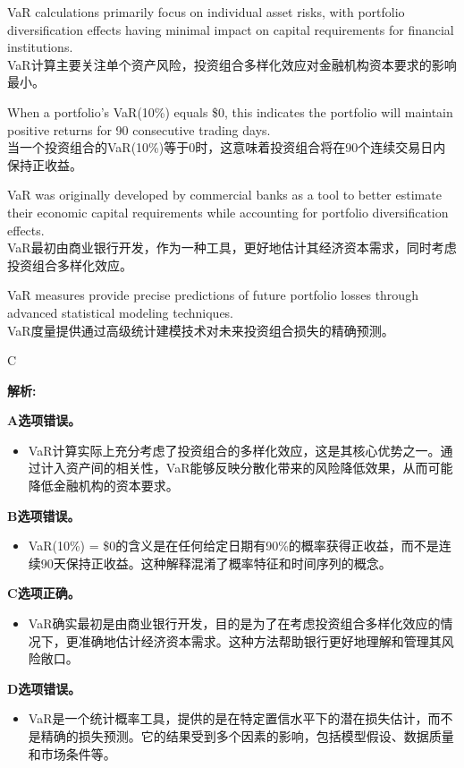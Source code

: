 \documentclass{article}
\newenvironment{explanation}
{\textbf{解析:}\par}
{\par}
\begin{document}
\begin{choices}
    \item VaR calculations primarily focus on individual asset risks, with portfolio diversification effects having minimal impact on capital requirements for financial institutions.\\
    VaR计算主要关注单个资产风险，投资组合多样化效应对金融机构资本要求的影响最小。
    
    \item When a portfolio's VaR(10\%) equals \$0, this indicates the portfolio will maintain positive returns for 90 consecutive trading days.\\
    当一个投资组合的VaR(10\%)等于0时，这意味着投资组合将在90个连续交易日内保持正收益。
    
    \item VaR was originally developed by commercial banks as a tool to better estimate their economic capital requirements while accounting for portfolio diversification effects.\\
    VaR最初由商业银行开发，作为一种工具，更好地估计其经济资本需求，同时考虑投资组合多样化效应。
    
    \item VaR measures provide precise predictions of future portfolio losses through advanced statistical modeling techniques.\\
    VaR度量提供通过高级统计建模技术对未来投资组合损失的精确预测。
\end{choices}

\begin{correctanswer}
    C
\end{correctanswer}

\begin{explanation}
    \textbf{A选项错误。}
    \begin{itemize}
        \item VaR计算实际上充分考虑了投资组合的多样化效应，这是其核心优势之一。通过计入资产间的相关性，VaR能够反映分散化带来的风险降低效果，从而可能降低金融机构的资本要求。
    \end{itemize}

    \textbf{B选项错误。}
    \begin{itemize}
        \item VaR(10\%) = \$0的含义是在任何给定日期有90\%的概率获得正收益，而不是连续90天保持正收益。这种解释混淆了概率特征和时间序列的概念。
    \end{itemize}

    \textbf{C选项正确。}
    \begin{itemize}
        \item VaR确实最初是由商业银行开发，目的是为了在考虑投资组合多样化效应的情况下，更准确地估计经济资本需求。这种方法帮助银行更好地理解和管理其风险敞口。
    \end{itemize}

    \textbf{D选项错误。}
    \begin{itemize}
        \item VaR是一个统计概率工具，提供的是在特定置信水平下的潜在损失估计，而不是精确的损失预测。它的结果受到多个因素的影响，包括模型假设、数据质量和市场条件等。
    \end{itemize}
\end{explanation}
\end{document}
